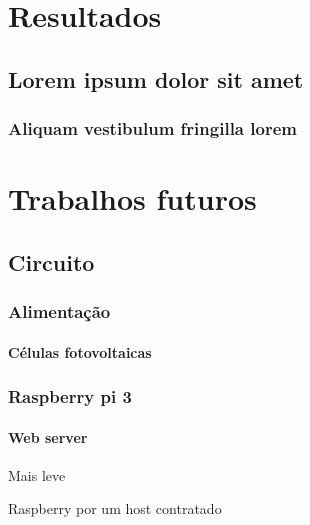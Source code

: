 \documentclass[
12pt,				%
openany,			%
twoside,			%
a4paper,			%
english,			%
french,				%
spanish,			%
brazil,				%
]{abntex2}
\begin{document}
\part{Resultados}

\chapter{Lorem ipsum dolor sit amet}

\section{Aliquam vestibulum fringilla lorem}

\lipsum[1]

\lipsum[2-3]


\part{Trabalhos futuros}
\chapter{Circuito}

\section{Alimentação}
\subsection{Células fotovoltaicas}

\section{Raspberry pi 3}
\subsection{Web server}
Mais leve

Raspberry por um host contratado
\end{document}
